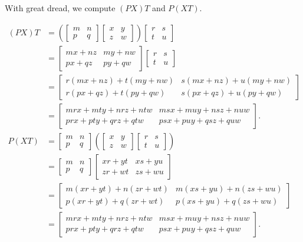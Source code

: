 \documentclass[../key.tex]{subfiles}
\begin{document}
With great dread, we compute $(PX)T$ and $P(XT)$.

\begin{align*}
(PX)T &= \left(\begin{bmatrix} m & n \\ p & q \end{bmatrix}\begin{bmatrix} x & y \\ z & w \end{bmatrix}\right)\begin{bmatrix} r & s \\ t & u \end{bmatrix} \\
&= \begin{bmatrix} mx + nz & my + nw \\ px + qz & py + qw \end{bmatrix} \begin{bmatrix} r & s \\ t & u \end{bmatrix} \\
&= \begin{bmatrix} r(mx+nz)+t(my+nw) & s(mx+nz) + u(my+nw) \\ r(px+qz) + t(py+qw) & s(px+qz) + u(py+qw)\end{bmatrix} \\
&= \begin{bmatrix} mrx+mty+nrz+ntw & msx+muy+nsz+nuw \\ prx+pty+qrz+qtw & psx+puy+qsz+quw \end{bmatrix}. \\
P(XT) &= \begin{bmatrix} m & n \\ p & q \end{bmatrix}\left(\begin{bmatrix} x & y \\ z & w \end{bmatrix}\begin{bmatrix} r & s \\ t & u \end{bmatrix}\right) \\
&= \begin{bmatrix} m & n \\ p & q \end{bmatrix}\begin{bmatrix}xr + yt & xs + yu \\ zr + wt & zs + wu \end{bmatrix} \\
&= \begin{bmatrix} m(xr+yt) + n(zr+wt) & m(xs+yu) + n(zs+wu) \\ p(xr+yt) + q(zr+wt) & p(xs+yu) + q(zs+wu) \end{bmatrix} \\
&= \begin{bmatrix} mrx+mty+nrz+ntw & msx+muy+nsz+nuw \\ prx+pty+qrz+qtw & psx+puy+qsz+quw \end{bmatrix}.
\end{align*}
\end{document}
